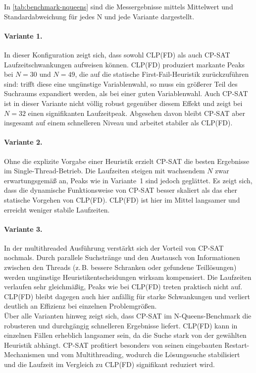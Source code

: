 \documentclass[12pt,a4paper]{article}
\begin{document}
In \autoref{tab:benchmark-nqueens} sind die Messergebnisse mittels Mittelwert und Standardabweichung für jedes N und jede Variante dargestellt.
\paragraph{Variante 1.}
In dieser Konfiguration zeigt sich, dass sowohl CLP(FD) als auch CP-SAT Laufzeitschwankungen aufweisen können. 
CLP(FD) produziert markante Peaks bei $N=30$ und $N=49$, die auf die statische First-Fail-Heuristik zurückzuführen sind: 
trifft diese eine ungünstige Variablenwahl, so muss ein größerer Teil des Suchraums expandiert werden, als bei einer \glqq guten\grqq{} Variablenwahl. 
Auch CP-SAT ist in dieser Variante nicht völlig robust gegenüber diesem Effekt und zeigt bei $N=32$ einen signifikanten Laufzeitpeak. 
Abgesehen davon bleibt CP-SAT aber insgesamt auf einem schnelleren Niveau und arbeitet stabiler als CLP(FD).
\paragraph{Variante 2.}
Ohne die explizite Vorgabe einer Heuristik erzielt CP-SAT die besten Ergebnisse im Single-Thread-Betrieb. 
Die Laufzeiten steigen mit wachsendem $N$ zwar erwartungsgemäß an, Peaks wie in Variante~1 sind jedoch geglättet. 
Es zeigt sich, dass die dynamische Funktionsweise von CP-SAT besser skaliert als das eher statische Vorgehen von CLP(FD).
CLP(FD) ist hier im Mittel langsamer und erreicht weniger stabile Laufzeiten.
\paragraph{Variante 3.}
In der multithreaded Ausführung verstärkt sich der Vorteil von CP-SAT nochmals. 
Durch parallele Suchstränge und den Austausch von Informationen zwischen den Threads (z.\,B. bessere Schranken oder gefundene Teillösungen) werden ungünstige Heuristikentscheidungen wirksam kompensiert. 
Die Laufzeiten verlaufen sehr gleichmäßig, Peaks wie bei CLP(FD) treten praktisch nicht auf. 
CLP(FD) bleibt dagegen auch hier anfällig für starke Schwankungen und verliert deutlich an Effizienz bei einzelnen Problemgrößen. 
\\

\noindent
Über alle Varianten hinweg zeigt sich, dass CP-SAT im N-Queens-Benchmark die robusteren und durchgängig schnelleren Ergebnisse liefert. 
CLP(FD) kann in einzelnen Fällen erheblich langsamer sein, da die Suche stark von der gewählten Heuristik abhängt. 
CP-SAT profitiert besonders von seinen eingebauten Restart-Mechanismen und vom Multithreading, wodurch die Lösungssuche stabilisiert und die Laufzeit im Vergleich zu CLP(FD) signifikant reduziert wird.
\end{document}
